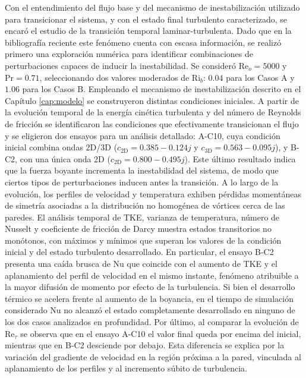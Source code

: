 Con el entendimiento del flujo base y del mecanismo de inestabilización utilizado para transicionar el sistema, y con el estado final turbulento caracterizado, se encaró el estudio de la transición temporal laminar-turbulenta. Dado que en la bibliografía reciente este fenómeno cuenta con escasa información, se realizó primero una exploración numérica para identificar combinaciones de perturbaciones capaces de inducir la inestabilidad. Se consideró $\text{Re}_o=5000$ y $\text{Pr}=0\text{.}71$, seleccionando dos valores moderados de $\text{Ri}_b$: $0\text{.}04$ para los Casos A y $1\text{.}06$ para los Casos B. Empleando el mecanismo de inestabilización descrito en el Capítulo \ref{cap:modelo} se construyeron distintas condiciones iniciales. A partir de la evolución temporal de la energía cinética turbulenta y del número de Reynolds de fricción se identificaron las condiciones que efectivamente transicionan el flujo y se eligieron dos ensayos para un análisis detallado: A-C10, cuya condición inicial combina ondas 2D/3D ($c_{\text{2D}}=0\text{.}385 - 0\text{.}124 j$ y $c_{\text{3D}}=0\text{.}563 - 0\text{.}095 j$), y B-C2, con una única onda 2D ($c_{\text{2D}}=0\text{.}800 - 0\text{.}495 j$). Este último resultado indica que la fuerza boyante incrementa la inestabilidad del sistema, de modo que ciertos tipos de perturbaciones inducen antes la transición. A lo largo de la evolución, los perfiles de velocidad y temperatura exhiben pérdidas momentáneas de simetría asociadas a la distribución no homogénea de vórtices cerca de las paredes. El análisis temporal de TKE, varianza de temperatura, número de Nusselt y coeficiente de fricción de Darcy muestra estados transitorios no monótonos, con máximos y mínimos que superan los valores de la condición inicial y del estado turbulento desarrollado. En particular, el ensayo B-C2 presenta una caída brusca de Nu que coincide con el aumento de TKE y el aplanamiento del perfil de velocidad en el mismo instante, fenómeno atribuible a la mayor difusión de momento por efecto de la turbulencia. Si bien el desarrollo térmico se \linebreak acelera frente al aumento de la boyancia, en el tiempo de simulación considerado Nu no alcanzó el estado completamente desarrollado en ninguno de los dos casos analizados en profundidad. Por último, al comparar la evolución de $\text{Re}_{\tau}$ se observa que en el ensayo A-C10 el valor final queda por encima del inicial, mientras que en B-C2 desciende por debajo. Esta diferencia se explica por la variación del gradiente de velocidad en la región próxima a la pared, vinculada al aplanamiento de los perfiles y al incremento súbito de turbulencia.


